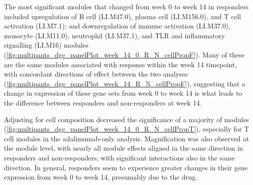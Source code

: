 The most significant modules that changed from week 0 to week 14 in responders included
upregulation of B cell (LI.M47.0), plasma cell (LI.M156.0), and T cell activation (LI.M7.1);
and downregulation of immune activation (LI.M37.0), monocyte (LI.M11.0), neutrophil (LI.M37.1), and TLR and inflammatory signalling (LI.M16) modules (\cref{fig:multipants_dge_panelPlot_week_14_0_R_N_cellPropF}).
Many of these are the same modules associated with response within the week 14 timepoint, with concordant directions of effect between the two analyses (\cref{fig:multipants_dge_panelPlot_week_14_R_N_cellPropF}),
suggesting that a change in expression of these gene sets from week 0 to week 14 is what leads to the difference between responders and non-responders at week 14.

Adjusting for cell composition decreased the significance of a majority of modules (\cref{fig:multipants_dge_panelPlot_week_14_0_R_N_cellPropT}),
especially for T cell modules in the adalimumab-only analysis.
Magnification was also observed at the module level, with nearly all module effects aligned in the same direction in responders and non-responders, with significant interactions also in the same direction.
In general, responders seem to experience greater changes in their gene expression from week 0 to week 14, presumably due to the drug.

